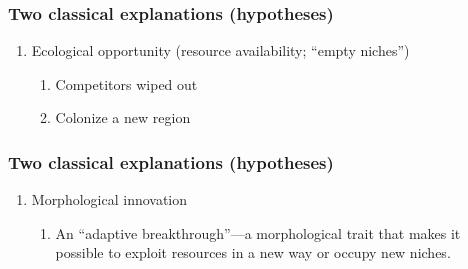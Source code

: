 \begin{frame}[t]
    \frametitle{Two classical explanations (hypotheses)}
    \begin{adjustwidth}{-2em}{-1.5em}

        \begin{enumerate}
            \item Ecological opportunity (resource availability; ``empty
                niches'')
            \begin{enumerate}
                \item Competitors wiped out


                \vspace{1cm}
                \item Colonize a new region

            \end{enumerate}
        \end{enumerate}
    \end{adjustwidth}
\end{frame}

\begin{frame}[t]
    \frametitle{Two classical explanations (hypotheses)}
    \begin{adjustwidth}{-2em}{-1.5em}

        \begin{enumerate}
            \addtocounter{enumi}{1}

            \item Morphological innovation

            \begin{enumerate}

                \item An ``adaptive breakthrough''---a morphological trait that
                    makes it possible to exploit resources in a new way or
                    occupy new niches.

            \end{enumerate}
        \end{enumerate}
    \end{adjustwidth}
\end{frame}

